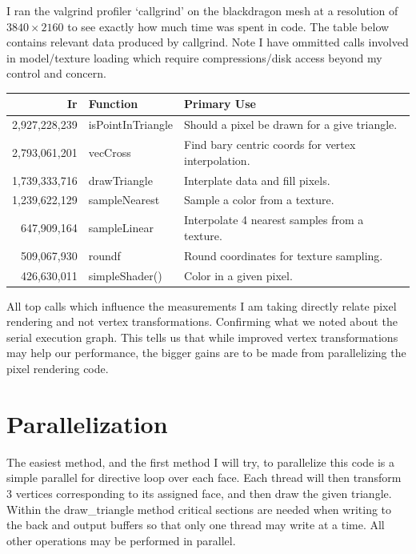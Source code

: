 \documentclass[12pt]{article}
\begin{document}
I ran the valgrind profiler `callgrind' on the blackdragon mesh at a resolution of $3840\times2160$ to see
exactly how much time was spent in code. The table below contains relevant data produced by callgrind.
Note I have ommitted calls involved in model/texture loading which require compressions/disk access beyond
my control and concern.

\begin{center}
	\begin{tabular}{|r|l|l|}
		\hline
		Ir & Function & Primary Use \\ \hline
		2,927,228,239 & isPointInTriangle & Should a pixel be drawn for a give triangle. \\ \hline
		2,793,061,201 & vecCross & Find bary centric coords for vertex interpolation. \\ \hline
		1,739,333,716 & drawTriangle & Interplate data and fill pixels. \\ \hline
		1,239,622,129 & sampleNearest & Sample a color from a texture. \\ \hline
		647,909,164 & sampleLinear & Interpolate 4 nearest samples from a texture.\\ \hline
		509,067,930 & roundf & Round coordinates for texture sampling. \\ \hline
		426,630,011 & simpleShader() & Color in a given pixel. \\ \hline
	\end{tabular}
\end{center}

All top calls which influence the measurements I am taking directly relate pixel rendering and not
vertex transformations. Confirming what we noted about the serial execution graph. This tells us 
that while improved vertex transformations may help our performance, the bigger gains are to be made
from parallelizing the pixel rendering code.

\section*{Parallelization}

The easiest method, and the first method I will try, to parallelize this code is a simple parallel for
directive loop over each face. Each thread will then transform 3 vertices corresponding to its assigned
face, and then draw the given triangle. Within the draw\_triangle method critical sections are needed
when writing to the back and output buffers so that only one thread may write at a time. All other
operations may be performed in parallel.
\end{document}
